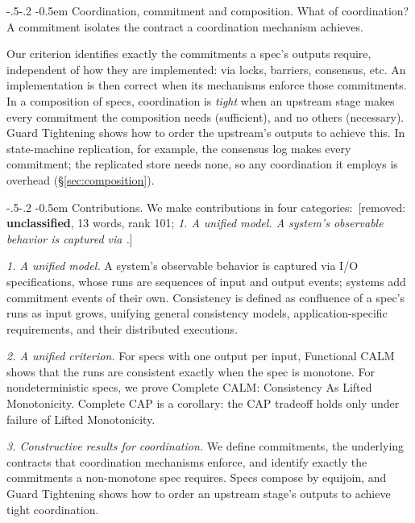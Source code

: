 \documentclass[sigconf]{cidr-2027}
\makeatletter
\theoremstyle{remark}
\renewcommand\paragraph{\@startsection{paragraph}{4}{\z@}%
  {-.5\baselineskip \@plus -2\p@ \@minus -.2\p@}%
  {-0.5em}%
  {\normalfont\bfseries}}
\newcommand{\commitment}{commitment\xspace}
\newcommand{\commitments}{commitments\xspace}
\newcommand{\spectype}[1][]{I/O specification#1\xspace}
\newif\ifshowrv \showrvfalse
\newcommand{\rv}[1]{\ifshowrv\textsuperscript{\textcolor{magenta}{\textbf{R#1}}}\fi}
\newcommand{\removednote}[1]{{\color{cutred}\footnotesize\,[removed: #1]\,}}
\makeatother
\begin{document}
\paragraph{Coordination, \commitment and composition.}
What of coordination? A
\commitment isolates the contract a coordination mechanism achieves.


Our criterion identifies exactly the \commitments a spec's
outputs require, independent of
how they are implemented: via locks, barriers, consensus, etc. An implementation is then correct when its mechanisms enforce those \commitments. \textcolor{newblue}{In a composition of specs,
coordination is \emph{tight} when an upstream stage makes every \commitment the
composition needs (sufficient), and no others
(necessary).\rv{8}  Guard Tightening shows how to order the upstream's
outputs to achieve this.} \textcolor{newblue}{In state-machine replication, for example, the consensus
log makes every \commitment; the replicated store needs none, so any
coordination it employs is overhead (\S\ref{sec:composition}).}

\paragraph{Contributions.}
We make contributions in four categories: \removednote{\textbf{unclassified}, 13 words, rank 101; \textit{1. A unified model. A system's observable behavior is captured via .}}

\textcolor{newblue}{\noindent
\emph{1. A unified model.} A system's observable behavior is captured via
        \spectype[s], whose runs are sequences of input and output events;
        systems add \commitment events of their own.} \textcolor{newblue}{Consistency is defined as
        confluence of a spec's runs as input grows, unifying general consistency models,
        application-specific requirements, and their distributed executions.}

\textcolor{newblue}{\noindent
\emph{2. A unified criterion.} For specs with one output per input, Functional
        CALM shows that the runs are consistent exactly when the spec is monotone.} For nondeterministic specs,
        we prove Complete CALM: Consistency As Lifted Monotonicity. Complete CAP is a corollary:
        the CAP tradeoff holds only under failure of Lifted Monotonicity.

\textcolor{newblue}{\noindent
\emph{3. Constructive results for coordination.} We define \commitments, the
        underlying contracts that coordination mechanisms enforce, and
        identify exactly the \commitments a non-monotone spec requires.\rv{1}  Specs compose by equijoin, and Guard Tightening
        shows how to order an upstream stage's outputs to achieve tight coordination.}
\end{document}

